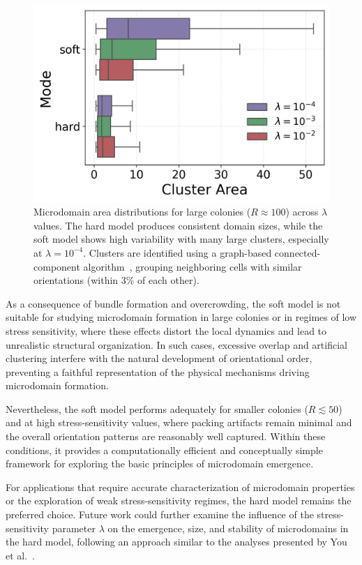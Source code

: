 \documentclass[conference]{IEEEtran}
\begin{document}
\begin{figure}[h]
    \centering
    \includegraphics[width=\linewidth]{figures/comparison_plots/cluster_area_boxplot.png}
    \caption{Microdomain area distributions for large colonies ($R \approx 100$) across $\lambda$ values. The hard model produces consistent domain sizes, while the soft model shows high variability with many large clusters, especially at $\lambda = 10^{-4}$. Clusters are identified using a graph-based connected-component algorithm~\cite{You2018}, grouping neighboring cells with similar orientations (within 3\% of each other).}
    \label{fig:cluster_area_boxplot}
\end{figure}

As a consequence of bundle formation and overcrowding, the soft model is not suitable for studying microdomain formation in large colonies or in regimes of low stress sensitivity, where these effects distort the local dynamics and lead to unrealistic structural organization. In such cases, excessive overlap and artificial clustering interfere with the natural development of orientational order, preventing a faithful representation of the physical mechanisms driving microdomain formation.

Nevertheless, the soft model performs adequately for smaller colonies ($R \lesssim 50$) and at high stress-sensitivity values, where packing artifacts remain minimal and the overall orientation patterns are reasonably well captured. Within these conditions, it provides a computationally efficient and conceptually simple framework for exploring the basic principles of microdomain emergence.

For applications that require accurate characterization of microdomain properties or the exploration of weak stress-sensitivity regimes, the hard model remains the preferred choice. Future work could further examine the influence of the stress-sensitivity parameter $\lambda$ on the emergence, size, and stability of microdomains in the hard model, following an approach similar to the analyses presented by You et al.~\cite{You2018}.
\end{document}
